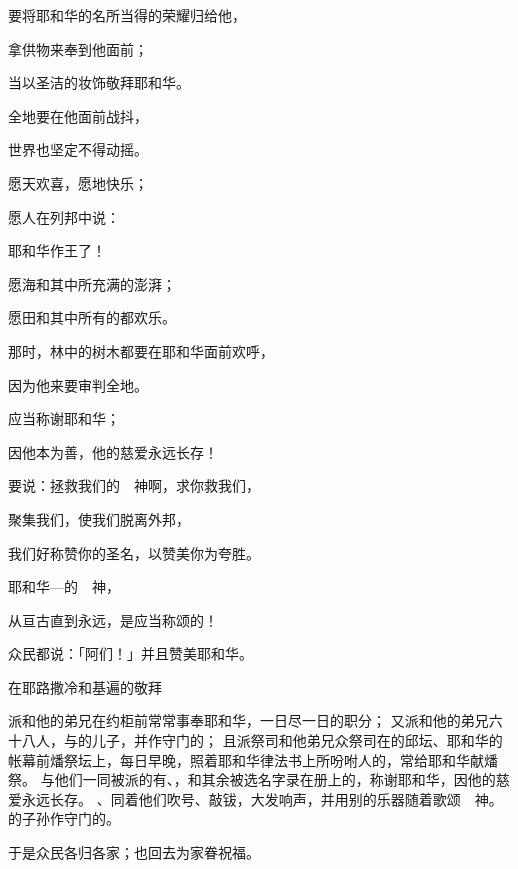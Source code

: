 {\par }{\Q {}要将耶和华的名所当得的荣耀归给他，
\par }{\Q 拿供物来奉到他面前；
\par }{\Q 当以圣洁的妆饰敬拜耶和华。
\par }{\Q {}全地要在他面前战抖，
\par }{\Q 世界也坚定不得动摇。
\par }{\Q {}愿天欢喜，愿地快乐；
\par }{\Q 愿人在列邦中说：
\par }{\Q 耶和华作王了！
\par }{\Q {}愿海和其中所充满的澎湃；
\par }{\Q 愿田和其中所有的都欢乐。
\par }{\Q {}那时，林中的树木都要在耶和华面前欢呼，
\par }{\Q 因为他来要审判全地。
\par }{\Q {}应当称谢耶和华；
\par }{\Q 因他本为善，他的慈爱永远长存！
\par }{\BB \par }{\Q {}要说：拯救我们的　神啊，求你救我们，
\par }{\Q 聚集我们，使我们脱离外邦，
\par }{\Q 我们好称赞你的圣名，以赞美你为夸胜。
\par }{\Q {}耶和华—{}的　神，
\par }{\Q 从亘古直到永远，是应当称颂的！
\par }{\Q 众民都说：「阿们！」并且赞美耶和华。
\par }{\SH 在耶路撒冷和基遍的敬拜
\par }{\PP {}派{}和他的弟兄在约柜前常常事奉耶和华，一日尽一日的职分；
又派{}和他的弟兄六十八人，与{}的儿子{}，并{}作守门的；
且派祭司{}和他弟兄众祭司在{}的邱坛、耶和华的帐幕前燔祭坛上，每日早晚，照着耶和华律法书上所吩咐{}人的，常给耶和华献燔祭。
与他们一同被派的有{}、{}，和其余被选名字录在册上的，称谢耶和华，因他的慈爱永远长存。
、{}同着他们吹号、敲钹，大发响声，并用别的乐器随着歌颂　神。{}的子孙作守门的。
\par }{\PP {}于是众民各归各家；{}也回去为家眷祝福。

}

